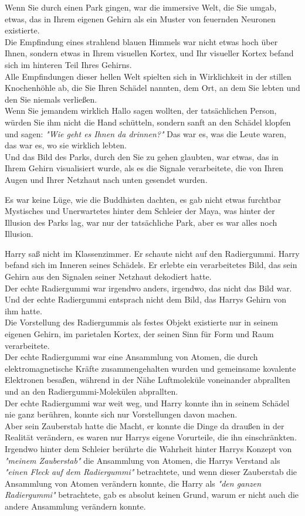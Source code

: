 {Wenn Sie durch einen Park gingen, war die immersive Welt, die Sie umgab, etwas, das in Ihrem eigenen Gehirn als ein Muster von feuernden Neuronen existierte.\\ Die Empfindung eines strahlend blauen Himmels war nicht etwas hoch über Ihnen, sondern etwas in Ihrem visuellen Kortex, und Ihr visueller Kortex befand sich im hinteren Teil Ihres Gehirns.\\ Alle Empfindungen dieser hellen Welt spielten sich in Wirklichkeit in der stillen Knochenhöhle ab, die Sie Ihren Schädel nannten, dem Ort, an dem Sie lebten und den Sie niemals verließen.\\ Wenn Sie jemandem wirklich Hallo sagen wollten, der tatsächlichen Person, würden Sie ihm nicht die Hand schütteln, sondern sanft an den Schädel klopfen und sagen: \emph{"Wie geht es Ihnen da drinnen?"} Das war es, was die Leute waren, das war es, wo sie wirklich lebten.\\ Und das Bild des Parks, durch den Sie zu gehen glaubten, war etwas, das in Ihrem Gehirn visualisiert wurde, als es die Signale verarbeitete, die von Ihren Augen und Ihrer Netzhaut nach unten gesendet wurden.

Es war keine Lüge, wie die Buddhisten dachten, es gab nicht etwas furchtbar Mystisches und Unerwartetes hinter dem Schleier der Maya, was hinter der Illusion des Parks lag, war nur der tatsächliche Park, aber es war alles noch Illusion.

Harry saß nicht im Klassenzimmer. Er schaute nicht auf den Radiergummi. Harry befand sich im Inneren seines Schädels. Er erlebte ein verarbeitetes Bild, das sein Gehirn aus den Signalen seiner Netzhaut dekodiert hatte.\\ Der echte Radiergummi war irgendwo anders, irgendwo, das nicht das Bild war. Und der echte Radiergummi entsprach nicht dem Bild, das Harrys Gehirn von ihm hatte.\\ Die Vorstellung des Radiergummis als festes Objekt existierte nur in seinem eigenen Gehirn, im parietalen Kortex, der seinen Sinn für Form und Raum verarbeitete.\\ Der echte Radiergummi war eine Ansammlung von Atomen, die durch elektromagnetische Kräfte zusammengehalten wurden und gemeinsame kovalente Elektronen besaßen, während in der Nähe Luftmoleküle voneinander abprallten und an den Radiergummi-Molekülen abprallten.\\ Der echte Radiergummi war weit weg, und Harry konnte ihn in seinem Schädel nie ganz berühren, konnte sich nur Vorstellungen davon machen.\\ Aber sein Zauberstab hatte die Macht, er konnte die Dinge da draußen in der Realität verändern, es waren nur Harrys eigene Vorurteile, die ihn einschränkten.\\ Irgendwo hinter dem Schleier berührte die Wahrheit hinter Harrys Konzept von\\ \emph{"meinem Zauberstab"} die Ansammlung von Atomen, die Harrys Verstand als \emph{"einen Fleck auf dem Radiergummi"} betrachtete, und wenn dieser Zauberstab die Ansammlung von Atomen verändern konnte, die Harry als \emph{"den ganzen Radiergummi"} betrachtete, gab es absolut keinen Grund, warum er nicht auch die andere Ansammlung verändern konnte.

}
